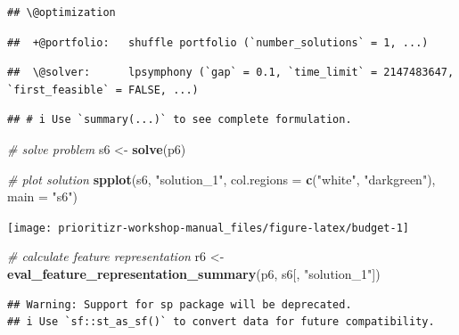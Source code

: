 \documentclass[12pt,]{book}
\newenvironment{Shaded}{\begin{snugshade}}{\end{snugshade}}
\newcommand{\CommentTok}[1]{\textcolor[rgb]{0.56,0.35,0.01}{\textit{#1}}}
\newcommand{\DataTypeTok}[1]{\textcolor[rgb]{0.13,0.29,0.53}{#1}}
\newcommand{\FloatTok}[1]{\textcolor[rgb]{0.00,0.00,0.81}{#1}}
\newcommand{\KeywordTok}[1]{\textcolor[rgb]{0.13,0.29,0.53}{\textbf{#1}}}
\newcommand{\NormalTok}[1]{#1}
\newcommand{\OperatorTok}[1]{\textcolor[rgb]{0.81,0.36,0.00}{\textbf{#1}}}
\newcommand{\OtherTok}[1]{\textcolor[rgb]{0.56,0.35,0.01}{#1}}
\newcommand{\StringTok}[1]{\textcolor[rgb]{0.31,0.60,0.02}{#1}}
\begin{document}
\begin{verbatim}
## \@optimization
\end{verbatim}

\begin{verbatim}
##  +@portfolio:   shuffle portfolio (`number_solutions` = 1, ...)
\end{verbatim}

\begin{verbatim}
##  \@solver:      lpsymphony (`gap` = 0.1, `time_limit` = 2147483647, `first_feasible` = FALSE, ...)
\end{verbatim}

\begin{verbatim}
## # i Use `summary(...)` to see complete formulation.
\end{verbatim}

\begin{Shaded}
\begin{Highlighting}[]
\CommentTok{# solve problem}
\NormalTok{s6 <-}\StringTok{ }\KeywordTok{solve}\NormalTok{(p6)}

\CommentTok{# plot solution}
\KeywordTok{spplot}\NormalTok{(s6, }\StringTok{"solution_1"}\NormalTok{, }\DataTypeTok{col.regions =} \KeywordTok{c}\NormalTok{(}\StringTok{"white"}\NormalTok{, }\StringTok{"darkgreen"}\NormalTok{), }\DataTypeTok{main =} \StringTok{"s6"}\NormalTok{)}
\end{Highlighting}
\end{Shaded}

\begin{center}\texttt{[image: prioritizr-workshop-manual\_files/figure-latex/budget-1]} \end{center}

\begin{Shaded}
\begin{Highlighting}[]
\CommentTok{# calculate feature representation}
\NormalTok{r6 <-}\StringTok{ }\KeywordTok{eval_feature_representation_summary}\NormalTok{(p6, s6[, }\StringTok{"solution_1"}\NormalTok{])}
\end{Highlighting}
\end{Shaded}

\begin{verbatim}
## Warning: Support for sp package will be deprecated.
## i Use `sf::st_as_sf()` to convert data for future compatibility.
\end{verbatim}

\begin{Shaded}
\end{Shaded}
\end{document}
